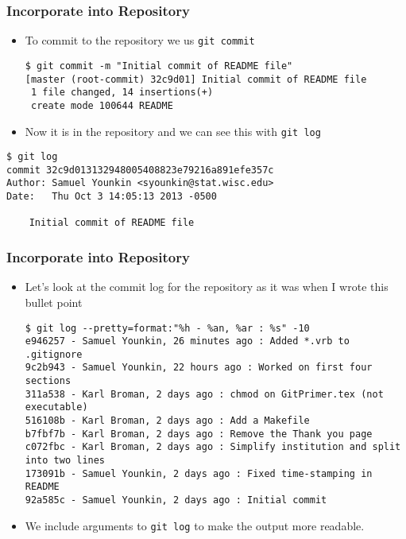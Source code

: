 \documentclass[handout,13pt,compress,c]{beamer}
\newcommand{\bi}{\begin{itemize}}
\newcommand{\ei}{\end{itemize}}
\begin{document}
\begin{frame}[fragile]
\frametitle{Incorporate into Repository}
\bi
\item To commit to the repository we us \texttt{git commit}
\begin{semiverbatim}
\begin{lstlisting}
$ git commit -m "Initial commit of README file"
[master (root-commit) 32c9d01] Initial commit of README file
 1 file changed, 14 insertions(+)
 create mode 100644 README
\end{lstlisting}
\end{semiverbatim}
\item Now it is in the repository and we can see this with \texttt{git log}
\ei
\begin{semiverbatim}
\begin{lstlisting}
$ git log
commit 32c9d013132948005408823e79216a891efe357c
Author: Samuel Younkin <syounkin@stat.wisc.edu>
Date:   Thu Oct 3 14:05:13 2013 -0500

    Initial commit of README file

\end{lstlisting}
\end{semiverbatim}
\end{frame}
\begin{frame}[fragile]
\frametitle{Incorporate into Repository}
\bi
\item Let's look at the commit log for the repository as it was when I wrote this bullet point
{\footnotesize \begin{semiverbatim}
\begin{lstlisting}
$ git log --pretty=format:"%h - %an, %ar : %s" -10
e946257 - Samuel Younkin, 26 minutes ago : Added *.vrb to .gitignore
9c2b943 - Samuel Younkin, 22 hours ago : Worked on first four sections
311a538 - Karl Broman, 2 days ago : chmod on GitPrimer.tex (not executable)
516108b - Karl Broman, 2 days ago : Add a Makefile
b7fbf7b - Karl Broman, 2 days ago : Remove the Thank you page
c072fbc - Karl Broman, 2 days ago : Simplify institution and split into two lines
173091b - Samuel Younkin, 2 days ago : Fixed time-stamping in README
92a585c - Samuel Younkin, 2 days ago : Initial commit
\end{lstlisting}
\end{semiverbatim}}
\item We include arguments to \texttt{git log} to make the output more readable.
\ei
\end{frame}
\end{document}
